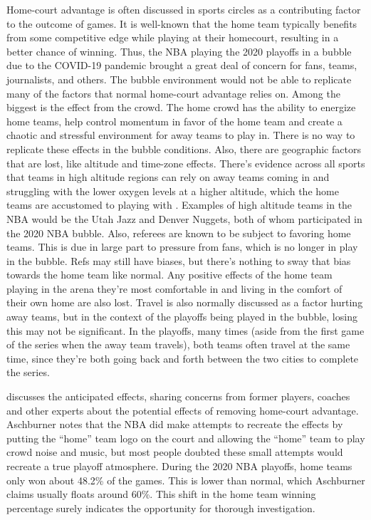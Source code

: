 \documentclass[10pt]{article}
\begin{document}
Home-court advantage is often discussed in sports circles as a contributing
factor to the outcome of games. It is well-known that the home team typically
benefits from some competitive edge while playing at their homecourt, resulting
in a better chance of winning. Thus, the NBA playing the 2020 playoffs in a
bubble due to the COVID-19 pandemic
brought a great deal of concern for fans, teams, journalists, and others. The bubble
environment would not be able to replicate many of the factors that normal home-court
advantage relies on. Among the biggest is the effect from the crowd. The home crowd has
the ability to energize home teams, help control momentum in favor of the home team and 
create a chaotic and stressful environment for away teams to play in. There is no way
to replicate these effects in the bubble conditions. Also, there are geographic factors
that are lost, like altitude and time-zone effects. There's evidence across all sports
that teams in high altitude regions can rely on away teams coming in and struggling with
the lower oxygen levels at a higher altitude, which the home teams are accustomed to playing
with \citet{Lopez}. Examples of high altitude teams in the NBA would be the Utah Jazz
and Denver Nuggets, both of whom participated in the 2020 NBA bubble. Also, referees 
are known to be subject to favoring home teams. This is due in large part to pressure
from fans, which is no longer in play in the bubble. Refs may still have biases, but 
there's nothing to sway that bias towards the home team like normal. Any positive
effects of the home team playing in the arena they're most comfortable in and
living in the comfort of their own home are also lost. Travel is also normally 
discussed as a factor hurting away teams, but in the context of the playoffs
being played in the bubble, losing this may not be significant. In the playoffs,
many times (aside from the first game of the series when the away team travels), 
both teams often travel at the same time, since they're both going back and forth
between the two cities to complete the series.
 
 \citet{Aschburner} discusses the anticipated effects, sharing
concerns from former players, coaches and other experts about
the potential effects of removing home-court advantage. Aschburner notes that the
NBA did make attempts to recreate the effects by putting the ``home'' team logo on
the court and allowing the ``home'' team to play crowd noise and music, but most
people doubted these small attempts would recreate a true playoff atmosphere.
During the 2020 NBA playoffs, home teams only won about 48.2\% of the games. This
is lower than normal, which Aschburner claims usually floats around 60\%. This
shift in the home team winning percentage surely indicates the opportunity for
thorough investigation.
\end{document}
